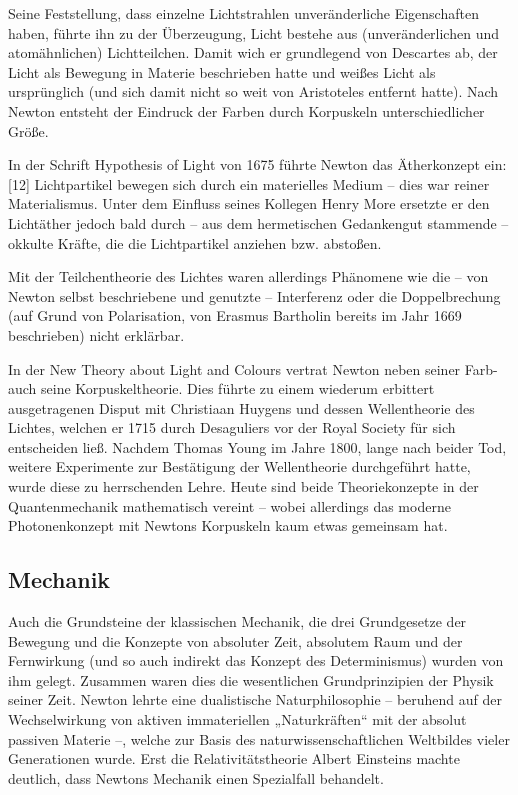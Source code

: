 Seine Feststellung, dass einzelne Lichtstrahlen unveränderliche Eigenschaften haben, führte ihn zu der Überzeugung, Licht bestehe aus (unveränderlichen und atomähnlichen) Lichtteilchen. Damit wich er grundlegend von Descartes ab, der Licht als Bewegung in Materie beschrieben hatte und weißes Licht als ursprünglich (und sich damit nicht so weit von Aristoteles entfernt hatte). Nach Newton entsteht der Eindruck der Farben durch Korpuskeln unterschiedlicher Größe.

In der Schrift Hypothesis of Light von 1675 führte Newton das Ätherkonzept ein:[12] Lichtpartikel bewegen sich durch ein materielles Medium – dies war reiner Materialismus. Unter dem Einfluss seines Kollegen Henry More ersetzte er den Lichtäther jedoch bald durch – aus dem hermetischen Gedankengut stammende – okkulte Kräfte, die die Lichtpartikel anziehen bzw. abstoßen.

Mit der Teilchentheorie des Lichtes waren allerdings Phänomene wie die – von Newton selbst beschriebene und genutzte – Interferenz oder die Doppelbrechung (auf Grund von Polarisation, von Erasmus Bartholin bereits im Jahr 1669 beschrieben) nicht erklärbar.

In der New Theory about Light and Colours vertrat Newton neben seiner Farb- auch seine Korpuskeltheorie. Dies führte zu einem wiederum erbittert ausgetragenen Disput mit Christiaan Huygens und dessen Wellentheorie des Lichtes, welchen er 1715 durch Desaguliers vor der Royal Society für sich entscheiden ließ. Nachdem Thomas Young im Jahre 1800, lange nach beider Tod, weitere Experimente zur Bestätigung der Wellentheorie durchgeführt hatte, wurde diese zu herrschenden Lehre. Heute sind beide Theoriekonzepte in der Quantenmechanik mathematisch vereint – wobei allerdings das moderne Photonenkonzept mit Newtons Korpuskeln kaum etwas gemeinsam hat.


\subsection{Mechanik}
Auch die Grundsteine der klassischen Mechanik, die drei Grundgesetze der Bewegung und die Konzepte von absoluter Zeit, absolutem Raum und der Fernwirkung (und so auch indirekt das Konzept des Determinismus) wurden von ihm gelegt. Zusammen waren dies die wesentlichen Grundprinzipien der Physik seiner Zeit. Newton lehrte eine dualistische Naturphilosophie – beruhend auf der Wechselwirkung von aktiven immateriellen „Naturkräften“ mit der absolut passiven Materie –, welche zur Basis des naturwissenschaftlichen Weltbildes vieler Generationen wurde. Erst die Relativitätstheorie Albert Einsteins machte deutlich, dass Newtons Mechanik einen Spezialfall behandelt.

